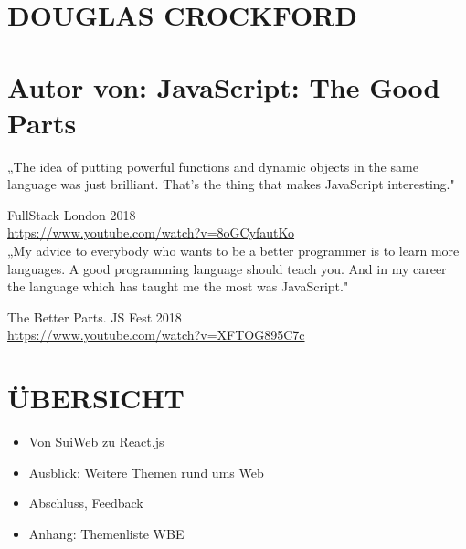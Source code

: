 \section*{DOUGLAS CROCKFORD}
\section*{Autor von: JavaScript: The Good Parts}
„The idea of putting powerful functions and dynamic objects in the same language was just brilliant. That's the thing that makes JavaScript interesting."

FullStack London 2018\\
\href{https://www.youtube.com/watch?v=8oGCyfautKo}{https://www.youtube.com/watch?v=8oGCyfautKo}\\
„My advice to everybody who wants to be a better programmer is to learn more languages. A good programming language should teach you. And in my career the language which has taught me the most was JavaScript."

The Better Parts. JS Fest 2018\\
\href{https://www.youtube.com/watch?v=XFTOG895C7c}{https://www.youtube.com/watch?v=XFTOG895C7c}

\section*{ÜBERSICHT}
\begin{itemize}
  \item Von SuiWeb zu React.js
  \item Ausblick: Weitere Themen rund ums Web
  \item Abschluss, Feedback
  \item Anhang: Themenliste WBE
\end{itemize}

